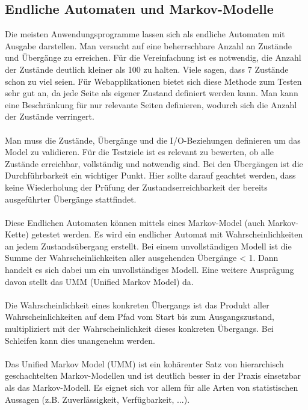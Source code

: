 \subsection{Endliche Automaten und Markov-Modelle}
Die meisten Anwendungsprogramme lassen sich als endliche Automaten mit Ausgabe darstellen. Man versucht auf eine beherrschbare Anzahl an Zustände und Übergänge zu erreichen. Für die Vereinfachung ist es notwendig, die Anzahl der Zustände deutlich kleiner als 100 zu halten. Viele sagen, dass 7 Zustände schon zu viel seien. Für Webapplikationen bietet sich diese Methode zum Testen sehr gut an, da jede Seite als eigener Zustand definiert werden kann. Man kann eine Beschränkung für nur relevante Seiten definieren, wodurch sich die Anzahl der Zustände verringert. 
\\\\
Man muss die Zustände, Übergänge und die I/O-Beziehungen definieren um das Model zu validieren. Für die Testziele ist es relevant zu bewerten, ob alle Zustände erreichbar, vollständig und notwendig sind. Bei den Übergängen ist die Durchführbarkeit  ein wichtiger Punkt. Hier sollte darauf geachtet werden, dass keine Wiederholung der Prüfung der Zustandserreichbarkeit der bereits ausgeführter Übergänge stattfindet. 
\\\\
Diese Endlichen Automaten können mittels eines Markov-Model (auch Markov-Kette) getestet werden. Es wird ein endlicher Automat mit Wahrscheinlichkeiten an jedem Zustandsübergang erstellt. Bei einem unvollständigen Modell ist die Summe der Wahrscheinlichkeiten aller ausgehenden Übergänge < 1. Dann handelt es sich dabei um ein unvollständiges Modell. Eine weitere Ausprägung davon stellt das UMM (Unified Markov Model) da.
\\\\
Die Wahrscheinlichkeit eines konkreten Übergangs ist das Produkt aller Wahrscheinlichkeiten auf dem Pfad vom Start bis zum Ausgangszustand, multipliziert mit der Wahrscheinlichkeit dieses konkreten Übergangs. Bei Schleifen kann dies unangenehm werden.
\\\\
Das Unified Markov Model (UMM) ist ein kohärenter Satz von hierarchisch geschachtelten Markov-Modellen und ist deutlich besser in der Praxis einsetzbar als das Markov-Modell. Es eignet sich vor allem für alle Arten von statistischen Aussagen (z.B. Zuverlässigkeit, Verfügbarkeit, ...).

